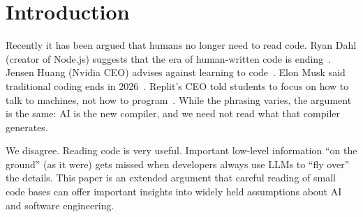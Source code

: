 \documentclass[AMA,STIX2COL]{WileyNJDv5}
\begin{document}


\maketitle
\section{Introduction}
\label{sec:intro}

Recently it has been argued that humans no longer need to read
code. Ryan Dahl (creator of Node.js) suggests that the era of
human-written code is ending~\cite{dahl2024}. Jensen Huang
(Nvidia CEO) advises against learning to code~\cite{huang2024}.
Elon Musk said traditional coding ends in 2026~\cite{musk2026}.
Replit's CEO told students to focus on how to talk to machines,
not how to program~\cite{masad2025}. While the phrasing varies,
the argument is the same: AI is the new compiler, and we need not
read what that compiler generates.

We disagree. Reading code is very useful. Important low-level
information ``on the ground'' (as it were) gets missed when
developers always use LLMs to ``fly over'' the details. This
paper is an extended argument that careful reading of small code
bases can offer important insights into widely held assumptions
about AI and software engineering.
\end{document}
